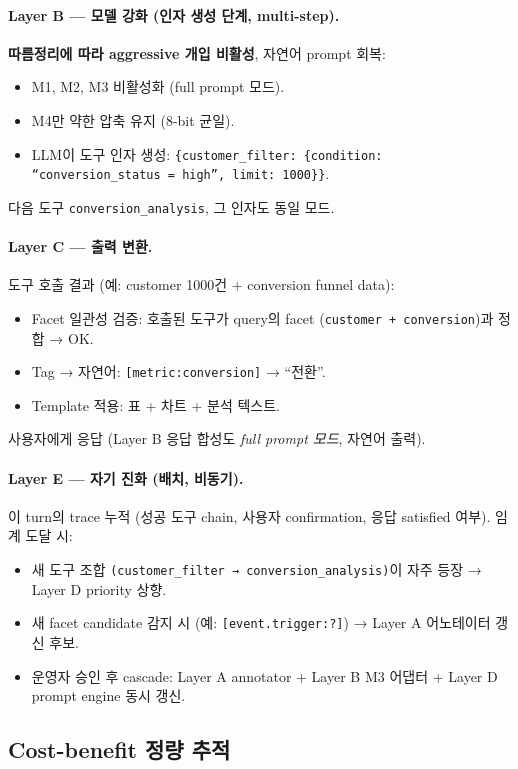 \paragraph{Layer B — 모델 강화 (인자 생성 단계, multi-step).}
\textbf{따름정리에 따라 aggressive 개입 비활성}, 자연어 prompt 회복:
\begin{itemize}[leftmargin=*]
\item M1, M2, M3 비활성화 (full prompt 모드).
\item M4만 약한 압축 유지 (8-bit 균일).
\item LLM이 도구 인자 생성: \texttt{\{customer\_filter: \{condition: ``conversion\_status = high'', limit: 1000\}\}}.
\end{itemize}
다음 도구 \texttt{conversion\_analysis}, 그 인자도 동일 모드.

\paragraph{Layer C — 출력 변환.}
도구 호출 결과 (예: customer 1000건 + conversion funnel data):
\begin{itemize}[leftmargin=*]
\item Facet 일관성 검증: 호출된 도구가 query의 facet (\texttt{customer + conversion})과 정합 → OK.
\item Tag → 자연어: \texttt{[metric:conversion]} → ``전환''.
\item Template 적용: 표 + 차트 + 분석 텍스트.
\end{itemize}
사용자에게 응답 (Layer B 응답 합성도 \emph{full prompt 모드}, 자연어 출력).

\paragraph{Layer E — 자기 진화 (배치, 비동기).}
이 turn의 trace 누적 (성공 도구 chain, 사용자 confirmation, 응답 satisfied 여부). 임계 도달 시:
\begin{itemize}[leftmargin=*]
\item 새 도구 조합 \texttt{(customer\_filter → conversion\_analysis)}이 자주 등장 → Layer D priority 상향.
\item 새 facet candidate 감지 시 (예: \texttt{[event.trigger:?]}) → Layer A 어노테이터 갱신 후보.
\item 운영자 승인 후 cascade: Layer A annotator + Layer B M3 어댑터 + Layer D prompt engine 동시 갱신.
\end{itemize}

\subsection{Cost-benefit 정량 추적}

